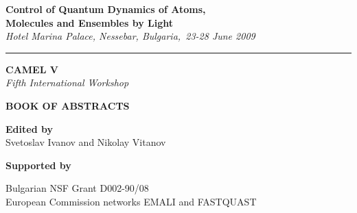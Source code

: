 \documentclass[12pt]{report}
\begin{document}
\thispagestyle{empty}



\begin{center}

 {\LARGE \textsf{\textbf{Control of Quantum Dynamics of Atoms,}\\ \vspace{2mm} \textbf{Molecules and Ensembles by Light} }}\\ \vspace{2mm}
{\Large \emph{Hotel Marina Palace, Nessebar, Bulgaria,\ 23-28 June 2009}}

 \vspace{3mm}

\hrule





\vspace{25mm}

{\fontsize{40}{48}\selectfont \textsf{\textbf{CAMEL V}}}\\
\vspace{5mm}
{\LARGE \emph{Fifth International Workshop}}\\

\vspace{25mm}

{\fontsize{36}{40}\selectfont \textsf{\textbf{BOOK OF  ABSTRACTS}}}\\

\vspace{15mm}

\Large{\textbf{Edited by} \\ Svetoslav Ivanov and Nikolay Vitanov}

\vspace{65mm}

\vspace{8mm}

{\Large \textbf{Supported by}

Bulgarian NSF Grant D002-90/08\\
European Commission networks EMALI and FASTQUAST

}




\end{center}
\end{document}
